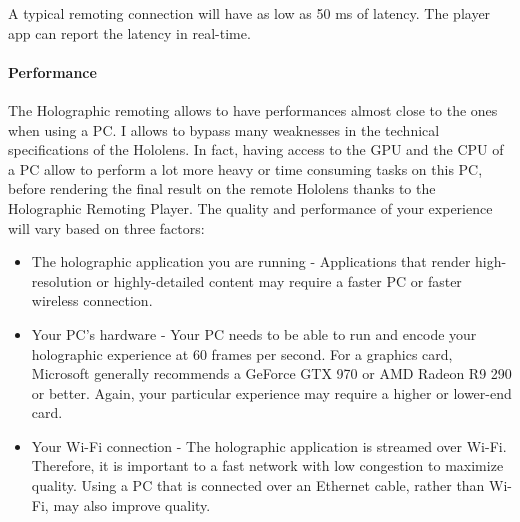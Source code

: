 A typical remoting connection will have as low as 50 ms of latency. The player app can report the latency in real-time.

\paragraph{Performance}

The Holographic remoting allows to have performances almost close to the ones when using a PC. I allows to bypass many weaknesses in the technical specifications of the Hololens. In fact, having access to the GPU and the CPU of a PC allow to perform a lot more heavy or time consuming tasks on this PC, before rendering the final result on the remote Hololens thanks to the Holographic Remoting Player.
The quality and performance of your experience will vary based on three factors:
\begin{itemize}

\item  The holographic application you are running - Applications that render high-resolution or highly-detailed content may require a faster PC or faster wireless connection.

\item Your PC's hardware - Your PC needs to be able to run and encode your holographic experience at 60 frames per second. For a graphics card, Microsoft generally recommends a GeForce GTX 970 or AMD Radeon R9 290 or better. Again, your particular experience may require a higher or lower-end card.

\item Your Wi-Fi connection - The holographic application is streamed over Wi-Fi. Therefore, it is important to a fast network with low congestion to maximize quality. Using a PC that is connected over an Ethernet cable, rather than Wi-Fi, may also improve quality.

\end{itemize}



